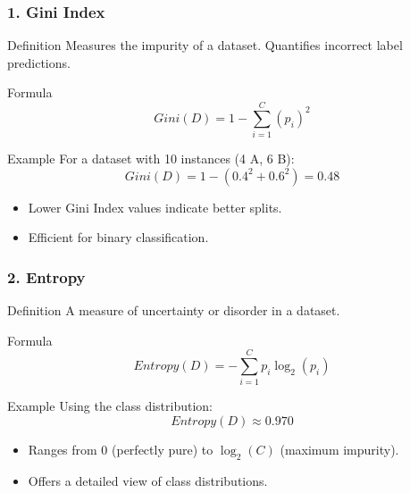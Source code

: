 \documentclass[aspectratio=169]{beamer}
\begin{document}
\begin{frame}[fragile]
    \frametitle{1. Gini Index}
    \begin{block}{Definition}
        Measures the impurity of a dataset. Quantifies incorrect label predictions.
    \end{block}
    \begin{block}{Formula}
        \begin{equation}
            Gini(D) = 1 - \sum_{i=1}^{C} (p_i)^2 
        \end{equation}
    \end{block}
    \begin{block}{Example}
        For a dataset with 10 instances (4 A, 6 B):
        \begin{equation}
            Gini(D) = 1 - (0.4^2 + 0.6^2) = 0.48
        \end{equation}
    \end{block}
    \begin{itemize}
        \item Lower Gini Index values indicate better splits.
        \item Efficient for binary classification.
    \end{itemize}
\end{frame}

\begin{frame}[fragile]
    \frametitle{2. Entropy}
    \begin{block}{Definition}
        A measure of uncertainty or disorder in a dataset.
    \end{block}
    \begin{block}{Formula}
        \begin{equation}
            Entropy(D) = - \sum_{i=1}^{C} p_i \log_2(p_i) 
        \end{equation}
    \end{block}
    \begin{block}{Example}
        Using the class distribution:
        \begin{equation}
            Entropy(D) \approx 0.970
        \end{equation}
    \end{block}
    \begin{itemize}
        \item Ranges from 0 (perfectly pure) to $\log_2(C)$ (maximum impurity).
        \item Offers a detailed view of class distributions.
    \end{itemize}
\end{frame}
\end{document}
